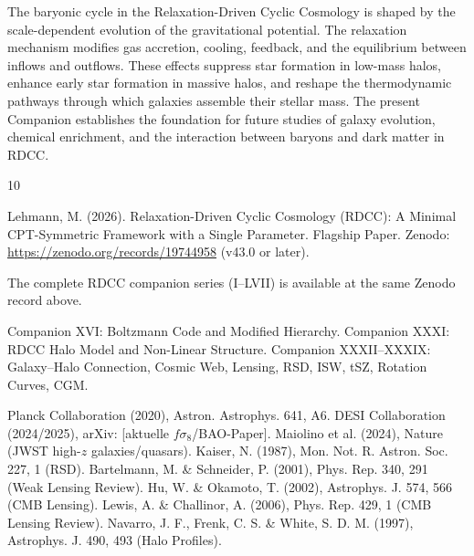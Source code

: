 \documentclass[11pt,a4paper]{article}
\begin{document}
The baryonic cycle in the Relaxation-Driven Cyclic Cosmology is shaped by the 
scale-dependent evolution of the gravitational potential. The relaxation mechanism 
modifies gas accretion, cooling, feedback, and the equilibrium between inflows and 
outflows. These effects suppress star formation in low-mass halos, enhance early 
star formation in massive halos, and reshape the thermodynamic pathways through 
which galaxies assemble their stellar mass. The present Companion establishes the 
foundation for future studies of galaxy evolution, chemical enrichment, and the 
interaction between baryons and dark matter in RDCC.


\begin{thebibliography}{10}

 Lehmann, M. (2026). Relaxation-Driven Cyclic Cosmology (RDCC): A Minimal CPT-Symmetric Framework with a Single Parameter. Flagship Paper. Zenodo: \url{https://zenodo.org/records/19744958} (v43.0 or later).

 The complete RDCC companion series (I--LVII) is available at the same Zenodo record above.

 Companion XVI: Boltzmann Code and Modified Hierarchy.
 Companion XXXI: RDCC Halo Model and Non-Linear Structure.
 Companion XXXII--XXXIX: Galaxy--Halo Connection, Cosmic Web, Lensing, RSD, ISW, tSZ, Rotation Curves, CGM.

 Planck Collaboration (2020), Astron. Astrophys. 641, A6.
 DESI Collaboration (2024/2025), arXiv: [aktuelle $f\sigma_8$/BAO-Paper].
 Maiolino et al. (2024), Nature (JWST high-$z$ galaxies/quasars).
 Kaiser, N. (1987), Mon. Not. R. Astron. Soc. 227, 1 (RSD).
 Bartelmann, M. \& Schneider, P. (2001), Phys. Rep. 340, 291 (Weak Lensing Review).
 Hu, W. \& Okamoto, T. (2002), Astrophys. J. 574, 566 (CMB Lensing).
 Lewis, A. \& Challinor, A. (2006), Phys. Rep. 429, 1 (CMB Lensing Review).
 Navarro, J. F., Frenk, C. S. \& White, S. D. M. (1997), Astrophys. J. 490, 493 (Halo Profiles).

\end{thebibliography}
\end{document}
